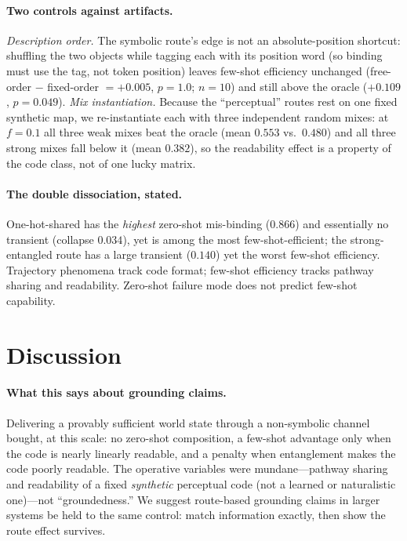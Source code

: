\documentclass[10pt]{article} %
\begin{document}
\paragraph{Two controls against artifacts.} \emph{Description order.} The symbolic route's edge is
not an absolute-position shortcut: shuffling the two objects while tagging each with its position
word (so binding must use the tag, not token position) leaves few-shot efficiency unchanged
(free-order $-$ fixed-order $= +0.005$, $p = 1.0$; $n{=}10$) and still above the oracle ($+0.109$,
$p = 0.049$). \emph{Mix instantiation.} Because the ``perceptual'' routes rest on one fixed
synthetic map, we re-instantiate each with three independent random mixes: at $f{=}0.1$ all three
weak mixes beat the oracle (mean $0.553$ vs.\ $0.480$) and all three strong mixes fall below it
(mean $0.382$), so the readability effect is a property of the code class, not of one lucky matrix.

\paragraph{The double dissociation, stated.} One-hot-shared has the \emph{highest} zero-shot
mis-binding ($0.866$) and essentially no transient (collapse $0.034$), yet is among the most
few-shot-efficient; the strong-entangled route has a large transient ($0.140$) yet the worst
few-shot efficiency. Trajectory phenomena track code format; few-shot efficiency tracks pathway
sharing and readability. Zero-shot failure mode does not predict few-shot capability.

\section{Discussion}
\label{sec:discussion}
\paragraph{What this says about grounding claims.} Delivering a provably sufficient world state
through a non-symbolic channel bought, at this scale: no zero-shot composition, a few-shot
advantage only when the code is nearly linearly readable, and a penalty when entanglement makes the
code poorly readable. The operative variables were mundane---pathway sharing and readability of a fixed
\emph{synthetic} perceptual code (not a learned or naturalistic one)---not ``groundedness.'' We
suggest route-based grounding claims in larger systems be held to the same
control: match information exactly, then show the route effect survives.
\end{document}
